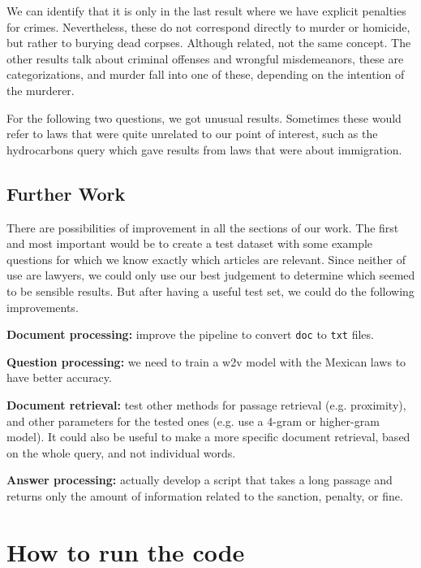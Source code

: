 \documentclass[letterpaper, margin=1in]{article}
\begin{document}
We can identify that it is only in the last result where we have explicit penalties for crimes. Nevertheless, these do not correspond directly to murder or homicide, but rather to burying dead corpses. Although related, not the same concept. The other results talk about criminal offenses and wrongful misdemeanors, these are categorizations, and murder fall into one of these, depending on the intention of the murderer. 

For the following two questions, we got unusual results. Sometimes these would refer to laws that were quite unrelated to our point of interest, such as the hydrocarbons query which gave results from laws that were about immigration. 
 
\subsection{Further Work}
There are possibilities of improvement in all the sections of our work. The first and most important would be to create a test dataset with some example questions for which we know exactly which articles are relevant. Since neither of use are lawyers, we could only use our best judgement to determine which seemed to be sensible results. But after having a useful test set, we could do the following improvements.
\begin{description}
\item \textbf{Document processing:} improve the pipeline to convert \texttt{doc} to \texttt{txt} files.
\item \textbf{Question processing:} we need to train a w2v model with the Mexican laws to have better accuracy.
\item \textbf{Document retrieval:} test other methods for passage retrieval (e.g. proximity), and other parameters for the tested ones (e.g. use a 4-gram or higher-gram model). It could also be useful to make a more specific document retrieval, based on the whole query, and not individual words.
\item \textbf{Answer processing:} actually develop a script that takes a long passage and returns only the amount of information related to the sanction, penalty, or fine.
\end{description}

\newpage
\section{How to run the code}
\end{document}
